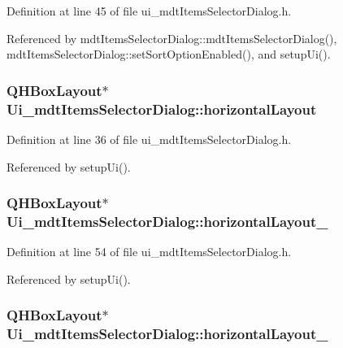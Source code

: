 Definition at line 45 of file ui\-\_\-mdt\-Items\-Selector\-Dialog.\-h.



Referenced by mdt\-Items\-Selector\-Dialog\-::mdt\-Items\-Selector\-Dialog(), mdt\-Items\-Selector\-Dialog\-::set\-Sort\-Option\-Enabled(), and setup\-Ui().

\hypertarget{class_ui__mdt_items_selector_dialog_a5c056b0287e33b9e1bcd1c80d522fc2c}{
\subsubsection[{horizontal\-Layout}]{\setlength{\rightskip}{0pt plus 5cm}Q\-H\-Box\-Layout$\ast$ Ui\-\_\-mdt\-Items\-Selector\-Dialog\-::horizontal\-Layout}}\label{class_ui__mdt_items_selector_dialog_a5c056b0287e33b9e1bcd1c80d522fc2c}


Definition at line 36 of file ui\-\_\-mdt\-Items\-Selector\-Dialog.\-h.



Referenced by setup\-Ui().

\hypertarget{class_ui__mdt_items_selector_dialog_a3953e7b9232bb9b70d556ca74201a8a7}{
\subsubsection[{horizontal\-Layout\-\_\-2}]{\setlength{\rightskip}{0pt plus 5cm}Q\-H\-Box\-Layout$\ast$ Ui\-\_\-mdt\-Items\-Selector\-Dialog\-::horizontal\-Layout\-\_}}\label{class_ui__mdt_items_selector_dialog_a3953e7b9232bb9b70d556ca74201a8a7}


Definition at line 54 of file ui\-\_\-mdt\-Items\-Selector\-Dialog.\-h.



Referenced by setup\-Ui().

\hypertarget{class_ui__mdt_items_selector_dialog_a400e7149ace7fc0dfb52e85b85072ebc}{
\subsubsection[{horizontal\-Layout\-\_\-3}]{\setlength{\rightskip}{0pt plus 5cm}Q\-H\-Box\-Layout$\ast$ Ui\-\_\-mdt\-Items\-Selector\-Dialog\-::horizontal\-Layout\-\_}}\label{class_ui__mdt_items_selector_dialog_a400e7149ace7fc0dfb52e85b85072ebc}


